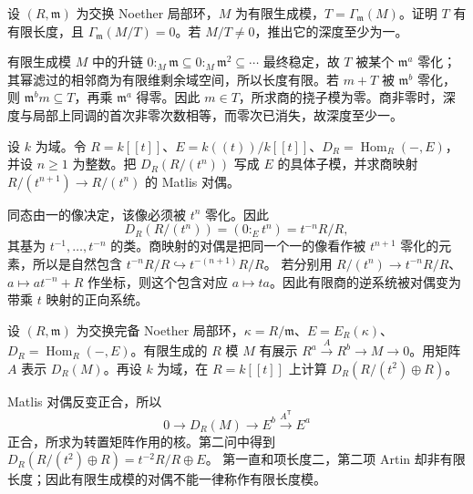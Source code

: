 \begin{optionalexercise}\label{b3:ex:22-remove-finite-torsion}
	设 \((R,\mathfrak m)\) 为交换 Noether 局部环，\(M\) 为有限生成模，\(T=\Gamma_{\mathfrak m}(M)\)。证明 \(T\) 有有限长度，且 \(\Gamma_{\mathfrak m}(M/T)=0\)。若 \(M/T\ne0\)，推出它的深度至少为一。
\end{optionalexercise}
\begin{solution}
	有限生成模 \(M\) 中的升链 \(0:_M\mathfrak m\subseteq0:_M\mathfrak m^2\subseteq\cdots\) 最终稳定，故 \(T\) 被某个 \(\mathfrak m^a\) 零化；其幂滤过的相邻商为有限维剩余域空间，所以长度有限。若 \(m+T\) 被 \(\mathfrak m^b\) 零化，则 \(\mathfrak m^bm\subseteq T\)，再乘 \(\mathfrak m^a\) 得零。因此 \(m\in T\)，所求商的挠子模为零。商非零时，深度与局部上同调的首次非零次数相等，而零次已消失，故深度至少一。
\end{solution}

\begin{optionalexercise}\label{b3:ex:22-dvr-dual-maps}
	设 \(k\) 为域。令 \(R=k[\![t]\!]\)、\(E=k(\!(t)\!)/k[\![t]\!]\)、\(D_R=\operatorname{Hom}_R(-,E)\)，并设 \(n\ge1\) 为整数。把 \(D_R(R/(t^n))\) 写成 \(E\) 的具体子模，并求商映射 \(R/(t^{n+1})\to R/(t^n)\) 的 Matlis 对偶。
\end{optionalexercise}
\begin{solution}
	同态由一的像决定，该像必须被 \(t^n\) 零化。因此
	\[
		D_R(R/(t^n))=(0:_Et^n)=t^{-n}R/R,
	\]
	其基为 \(t^{-1},\ldots,t^{-n}\) 的类。商映射的对偶是把同一个一的像看作被 \(t^{n+1}\) 零化的元素，所以是自然包含 \(t^{-n}R/R\hookrightarrow t^{-(n+1)}R/R\)。 若分别用 \(R/(t^n)\to t^{-n}R/R\)、\(a\mapsto at^{-n}+R\) 作坐标，则这个包含对应 \(a\mapsto ta\)。因此有限商的逆系统被对偶变为带乘 \(t\) 映射的正向系统。
\end{solution}

\begin{optionalexercise}\label{b3:ex:22-matlis-presentation}
	设 \((R,\mathfrak m)\) 为交换完备 Noether 局部环，\(\kappa=R/\mathfrak m\)、\(E=E_R(\kappa)\)、\(D_R=\operatorname{Hom}_R(-,E)\)。有限生成的 \(R\) 模 \(M\) 有展示 \(R^a\xrightarrow{A}R^b\to M\to0\)。用矩阵 \(A\) 表示 \(D_R(M)\)。再设 \(k\) 为域，在 \(R=k[\![t]\!]\) 上计算 \(D_R(R/(t^2)\oplus R)\)。
\end{optionalexercise}
\begin{solution}
	Matlis 对偶反变正合，所以
	\[
		0\longrightarrow D_R(M)\longrightarrow E^b\xrightarrow{A^{\mathsf T}}E^a
	\]
	正合，所求为转置矩阵作用的核。第二问中得到 \(D_R(R/(t^2)\oplus R)=t^{-2}R/R\oplus E\)。 第一直和项长度二，第二项 Artin 却非有限长度；因此有限生成模的对偶不能一律称作有限长度模。
\end{solution}

